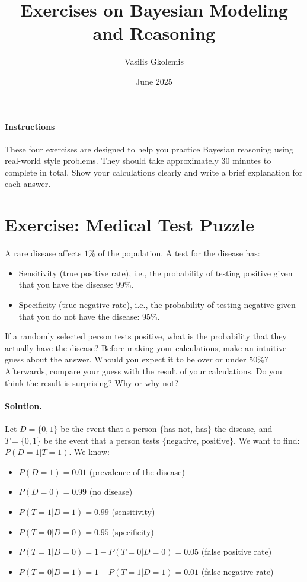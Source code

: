 \documentclass[11pt]{article}
\title{Exercises on Bayesian Modeling and Reasoning}
\author{Vasilis Gkolemis}
\date{June 2025}
\newif\ifshowanswers
\begin{document}
\maketitle

\paragraph{Instructions}
These four exercises are designed to help you practice Bayesian reasoning using real-world style problems. They should take approximately 30 minutes to complete in total. Show your calculations clearly and write a brief explanation for each answer.

\section{Exercise: Medical Test Puzzle}
A rare disease affects $1\%$ of the population. A test for the disease has:
\begin{itemize}
  \item Sensitivity (true positive rate), i.e., the probability of testing positive given that you have the disease: $99\%$.
  \item Specificity (true negative rate), i.e., the probability of testing negative given that you do not have the disease: $95\%$.
\end{itemize}
If a randomly selected person tests positive, what is the probability that they actually have the disease?
Before making your calculations, make an intuitive guess about the answer. Whould you expect it to be over or under $50\%$?
Afterwards, compare your guess with the result of your calculations.
Do you think the result is surprising? Why or why not?

\ifshowanswers
\paragraph{Solution.}

Let $D = \{0, 1\}$ be the event that a person $\{\text{has not, has}\}$ the disease,
and
$T = \{0, 1\}$ be the event that a person tests $\{\text{negative, positive}\}$.
We want to find: $P(D = 1 | T = 1)$.
We know:

\begin{itemize}
  \item $P(D = 1) = 0.01$ (prevalence of the disease)
  \item $P(D = 0) = 0.99$ (no disease)
  \item $P(T = 1 | D = 1) = 0.99$ (sensitivity)
  \item $P(T = 0 | D = 0) = 0.95$ (specificity)
  \item $P(T = 1 | D = 0) = 1 - P(T = 0 | D = 0) = 0.05$ (false positive rate)
  \item $P(T = 0 | D = 1) = 1 - P(T = 1 | D = 1) = 0.01$ (false negative rate)
\end{itemize}
\end{document}
